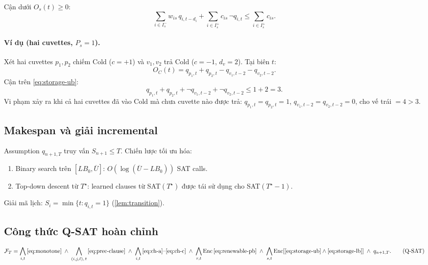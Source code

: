 \documentclass[11pt,a4paper]{article}
\theoremstyle{remark}
\begin{document}
Cận dưới $O_s(t) \ge 0$:
\begin{equation}
  \sum_{i \in I_s^-} w_{is}\, q_{i,t-d_i}
  + \sum_{i \in I_s^+} c_{is}\, \neg q_{i,t}
  \le \textstyle\sum_{i \in I_s^+} c_{is}.
  \label{eq:storage-lb}
\end{equation}

\paragraph{Ví dụ (hai cuvettes, $P_s = 1$).}
Xét hai cuvettes $p_1, p_2$ chiếm Cold ($c=+1$) và $v_1, v_2$ trả Cold
($c=-1$, $d_v=2$). Tại biên $t$:
\[
  O_C(t) = q_{p_1,t} + q_{p_2,t} - q_{v_1,t-2} - q_{v_2,t-2}.
\]
Cận trên \eqref{eq:storage-ub}:
\[
  q_{p_1,t} + q_{p_2,t} + \neg q_{v_1,t-2} + \neg q_{v_2,t-2} \le 1 + 2 = 3.
\]
Vi phạm xảy ra khi cả hai cuvettes đã vào Cold mà chưa cuvette nào được trả:
$q_{p_1,t}=q_{p_2,t}=1$, $q_{v_1,t-2}=q_{v_2,t-2}=0$, cho vế trái $= 4 > 3$.

\subsection{Makespan và giải incremental}

Assumption $q_{n+1,T}$ truy vấn $S_{n+1} \le T$.
Chiến lược tối ưu hóa:
\begin{enumerate}
  \item Binary search trên $[LB_0, \overline{U}]$: $O(\log(\overline{U}-LB_0))$ SAT calls.
  \item Top-down descent từ $T^\star$: learned clauses từ SAT$(T^\star)$
    được tái sử dụng cho SAT$(T^\star-1)$.
\end{enumerate}
Giải mã lịch: $S_i = \min\{t : q_{i,t} = 1\}$ (\cref{lem:transition}).

\subsection{Công thức Q-SAT hoàn chỉnh}

\begin{equation}
\mathcal{F}_T =
  \bigwedge_{i,t} \eqref{eq:monotone}
  \;\wedge\; \bigwedge_{(i,j,\ell),\,t} \eqref{eq:prec-clause}
  \;\wedge\; \bigwedge_{i,t} \eqref{eq:ch-a}\text{--}\eqref{eq:ch-c}
  \;\wedge\; \bigwedge_{r,t} \operatorname{Enc}\eqref{eq:renewable-pb}
  \;\wedge\; \bigwedge_{s,t} \operatorname{Enc}\!\left[\eqref{eq:storage-ub}\wedge\eqref{eq:storage-lb}\right]
  \;\wedge\; q_{n+1,T}.
\tag{Q-SAT}
\label{eq:qsat}
\end{equation}
\end{document}
